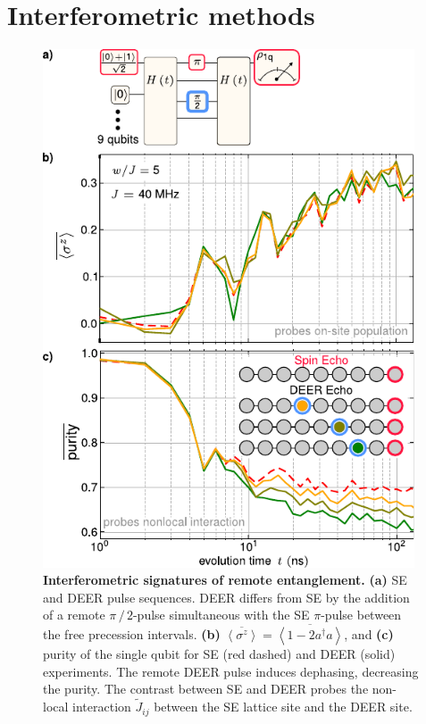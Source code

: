 \section{Interferometric methods} %
\begin{figure}[t]
 \centering
 \includegraphics[width=110mm]{./PDF/fig_3.pdf}
 \caption{
 \textbf{Interferometric signatures of remote entanglement.}
 \textbf{(a)} SE and DEER pulse sequences. DEER differs from SE by the addition of a remote $\pi\, /\,2$-pulse simultaneous with the SE $\pi$-pulse between the free precession intervals. \textbf{(b)}  $\overline{ \left< \sigma^z \right> } =\overline{ \left< 1 - 2 a^\dagger a \right> }$, and \textbf{(c)}  purity of the single qubit for SE (red dashed) and DEER (solid) experiments. The remote DEER pulse induces dephasing, decreasing the purity. The contrast between SE and DEER probes the non-local interaction $\widetilde{J}_{ij}$ between the SE lattice site and the DEER site.}
\end{figure}
